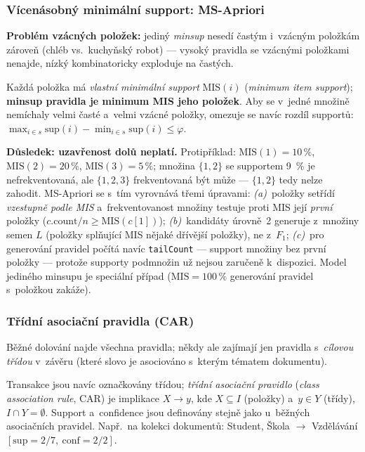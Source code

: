 \documentclass[11pt,a4paper]{article}
\theoremstyle{definition}
\begin{document}
\subsubsection{Vícenásobný minimální support: MS-Apriori}

\textbf{Problém vzácných položek:} jediný \emph{minsup} nesedí častým i~vzácným položkám
zároveň (chléb vs.\ kuchyňský robot) --- vysoký pravidla se vzácnými položkami nenajde,
nízký kombinatoricky exploduje na častých.

\begin{defbox}
Každá položka má \emph{vlastní minimální support} $\mathrm{MIS}(i)$ (\emph{minimum item
support}); \textbf{minsup pravidla je minimum MIS jeho položek}. Aby se v~jedné množině
nemíchaly velmi časté a~velmi vzácné položky, omezuje se navíc rozdíl supportů:
$\max_{i\in s}\mathrm{sup}(i)-\min_{i\in s}\mathrm{sup}(i)\le\varphi$.
\end{defbox}

\textbf{Důsledek: uzavřenost dolů neplatí.} Protipříklad: $\mathrm{MIS}(1)=10\,\%$,
$\mathrm{MIS}(2)=20\,\%$, $\mathrm{MIS}(3)=5\,\%$; množina $\{1,2\}$ se supportem 9~\% je
nefrekventovaná, ale $\{1,2,3\}$ frekventovaná být může --- $\{1,2\}$ tedy nelze zahodit.
MS-Apriori se s~tím vyrovnává třemi úpravami: \emph{(a)}~položky setřídí \emph{vzestupně
podle MIS} a~frekventovanost množiny testuje proti MIS její \emph{první} položky
($c.\mathrm{count}/n\ge\mathrm{MIS}(c[1])$); \emph{(b)}~kandidáty úrovně~2 generuje
z~množiny semen $L$ (položky splňující MIS nějaké dřívější položky), ne z~$F_1$;
\emph{(c)}~pro generování pravidel počítá navíc \texttt{tailCount} --- support množiny bez
první položky --- protože supporty podmnožin už nejsou zaručeně k~dispozici. Model jediného
minsupu je speciální případ ($\mathrm{MIS}=100\,\%$ generování pravidel s~položkou zakáže).

\subsubsection{Třídní asociační pravidla (CAR)}

Běžné dolování najde všechna pravidla; někdy ale zajímají jen pravidla s~\emph{cílovou
třídou} v~závěru (které slovo je asociováno s~kterým tématem dokumentu).

\begin{defbox}
Transakce jsou navíc označkovány třídou; \emph{třídní asociační pravidlo} (\emph{class
association rule}, CAR) je implikace $X\to y$, kde $X\subseteq I$ (položky) a~$y\in Y$
(třídy), $I\cap Y=\emptyset$. Support a~confidence jsou definovány stejně jako u~běžných
asociačních pravidel. Např.\ na kolekci dokumentů:
Student, Škola $\to$ Vzdělávání $[\mathrm{sup}=2/7,\ \mathrm{conf}=2/2]$.
\end{defbox}
\end{document}
